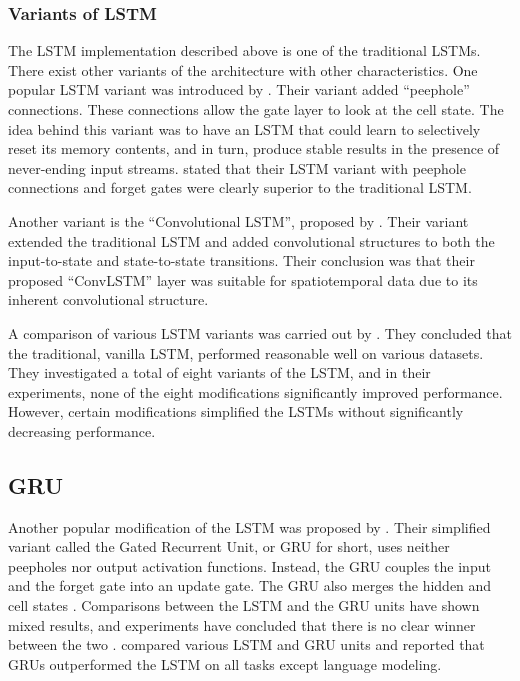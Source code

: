 \subsubsection{Variants of LSTM}
The LSTM implementation described above is one of the traditional LSTMs. There exist other variants of the architecture with other characteristics. One popular LSTM variant was introduced by \cite{gers2001lstm}. Their variant added ``peephole'' connections. These connections allow the gate layer to look at the cell state. The idea behind this variant was to have an LSTM that could learn to selectively reset its memory contents, and in turn, produce stable results in the presence of never-ending input streams. \cite{gers2001lstm} stated that their LSTM variant with peephole connections and forget gates were clearly superior to the traditional LSTM. 

Another variant is the ``Convolutional LSTM'', proposed by \cite{xingjian2015convolutional}. Their variant extended the traditional LSTM and added convolutional structures to both the input-to-state and state-to-state transitions. Their conclusion was that their proposed ``ConvLSTM'' layer was suitable for spatiotemporal data due to its inherent convolutional structure.

A comparison of various LSTM variants was carried out by \cite{greff2016lstm}. They concluded that the traditional, vanilla LSTM, performed reasonable well on various datasets. They investigated a total of eight variants of the LSTM, and in their experiments, none of the eight modifications significantly improved performance. However, certain modifications simplified the LSTMs without significantly decreasing performance. 

\subsection{GRU}
Another popular modification of the LSTM was proposed by \cite{chung2014empirical}. Their simplified variant called the Gated Recurrent Unit, or GRU for short, uses neither peepholes nor output activation functions. Instead, the GRU couples the input and the forget gate into an update gate. The GRU also merges the hidden and cell states  \citep{greff2016lstm, chung2014empirical}. Comparisons between the LSTM and the GRU units have shown mixed results, and experiments have concluded that there is no clear winner between the two \citep{greff2016lstm, chung2014empirical}. \cite{jozefowicz2015empirical} compared various LSTM and GRU units and reported that GRUs outperformed the LSTM on all tasks except language modeling.


